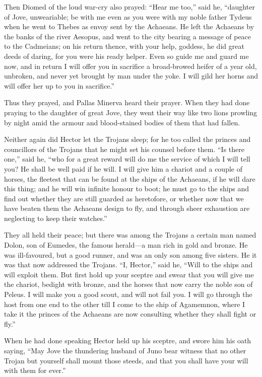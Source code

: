 Then Diomed of the loud war-cry also prayed: “Hear me too,” said he,
“daughter of Jove, unweariable; be with me even as you were with my noble
father Tydeus when he went to Thebes as envoy sent by the Achaeans. He
left the Achaeans by the banks of the river Aesopus, and went to the city
bearing a message of peace to the Cadmeians; on his return thence, with
your help, goddess, he did great deeds of daring, for you were his ready
helper. Even so guide me and guard me now, and in return I will offer you
in sacrifice a broad-browed heifer of a year old, unbroken, and never yet
brought by man under the yoke. I will gild her horns and will offer her up
to you in sacrifice.”

Thus they prayed, and Pallas Minerva heard their prayer. When they had
done praying to the daughter of great Jove, they went their way like two
lions prowling by night amid the armour and blood-stained bodies of them
that had fallen.

Neither again did Hector let the Trojans sleep; for he too called the
princes and councillors of the Trojans that he might set his counsel
before them. “Is there one,” said he, “who for a great reward will do me
the service of which I will tell you? He shall be well paid if he will. I
will give him a chariot and a couple of horses, the fleetest that can be
found at the ships of the Achaeans, if he will dare this thing; and he
will win infinite honour to boot; he must go to the ships and find out
whether they are still guarded as heretofore, or whether now that we have
beaten them the Achaeans design to fly, and through sheer exhaustion are
neglecting to keep their watches.”

They all held their peace; but there was among the Trojans a certain man
named Dolon, son of Eumedes, the famous herald—a man rich in gold
and bronze. He was ill-favoured, but a good runner, and was an only son
among five sisters. He it was that now addressed the Trojans. “I, Hector,”
said he, “Will to the ships and will exploit them. But first hold up your
sceptre and swear that you will give me the chariot, bedight with bronze,
and the horses that now carry the noble son of Peleus. I will make you a
good scout, and will not fail you. I will go through the host from one end
to the other till I come to the ship of Agamemnon, where I take it the
princes of the Achaeans are now consulting whether they shall fight or
fly.”

When he had done speaking Hector held up his sceptre, and swore him his
oath saying, “May Jove the thundering husband of Juno bear witness that no
other Trojan but yourself shall mount those steeds, and that you shall
have your will with them for ever.”

